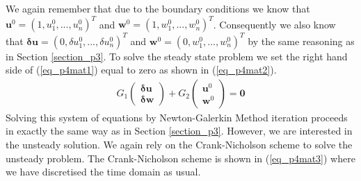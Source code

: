 \documentclass[11pt,fleqn]{article}
\theoremstyle{defstyle}
\begin{document}
We again remember that due to the boundary conditions we know that $\mathbf{u}^0 = \left(1,u^0_1,...,u^0_n \right)^T$ and $\mathbf{w}^0 = \left(1,w^0_1,...,w^0_n \right)^T$. Consequently we also know that $\mathbf{\delta u} = \left(0,\delta u^0_1,...,\delta u^0_n \right)^T$ and $\mathbf{w}^0 = \left(0,w^0_1,...,w^0_n \right)^T$ by the same reasoning as in Section \ref{section_p3}. To solve the steady state problem we set the right hand side of (\ref{eq_p4mat1}) equal to zero as shown in (\ref{eq_p4mat2}). 
\begin{equation}
\begin{aligned}
G_1 \begin{pmatrix}
\mathbf{\delta u} \\ \mathbf{\delta w} 
\end{pmatrix} + G_2 \begin{pmatrix}
\mathbf{u}^0 \\ \mathbf{w}^0 
\end{pmatrix}
= \mathbf{0}
\end{aligned}
\label{eq_p4mat2}
\end{equation}
Solving this system of equations by Newton-Galerkin Method iteration proceeds in exactly the same way as in Section \ref{section_p3}. However, we are interested in the unsteady solution. We again rely on the Crank-Nicholson scheme to solve the unsteady problem. The Crank-Nicholson scheme is shown in (\ref{eq_p4mat3}) where we have discretised the time domain as usual.
\end{document}
